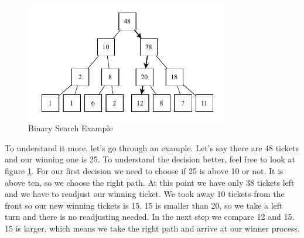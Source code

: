 \begin{figure}
    \centering
    \includegraphics[width=0.8\textwidth]{Assets/Binary-Search.pdf}
    \caption{Binary Search Example}
    \label{fig:binary-search}
\end{figure}

To understand it more, let's go through an example. Let's say there are 48 tickets and our winning one is 25.
To understand the decision better, feel free to look at figure \ref{fig:binary-search}.
For our first decision we need to choose if 25 is above 10 or not.
It is above ten, so we choose the right path.
At this point we have only 38 tickets left and we have to readjust our winning ticket.
We took away 10 tickets from the front so our new winning tickets is 15.
15 is smaller than 20, so we take a left turn and there is no readjusting needed.
In the next step we compare 12 and 15.
15 is larger, which means we take the right path and arrive at our winner process.

